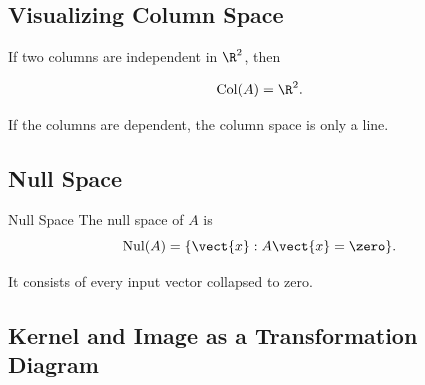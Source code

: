 \subsection{Visualizing Column Space}
\label{subsec:visual-column-space}

If two columns are independent in \(\R^2\), then

\[ \operatorname{Col}(A)=\R^2. \]

If the columns are dependent, the column space is only a line.

\begin{center}
\end{center}

\subsection{Null Space}
\label{subsec:null-space}

\begin{definitionbox}{Null Space}
The null space of \(A\) is
\[ \operatorname{Nul}(A)=\{\vect{x}:A\vect{x}=\zero\}. \]
\end{definitionbox}

It consists of every input vector collapsed to zero.

\subsection{Kernel and Image as a Transformation Diagram}
\label{subsec:kernel-image-diagram}

